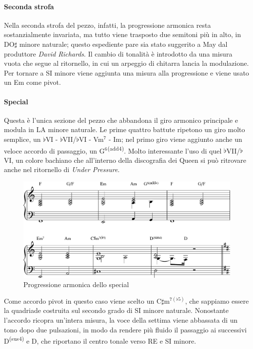 \documentclass[12pt]{article}
\begin{document}
\paragraph{Seconda strofa}
Nella seconda strofa del pezzo, infatti, la progressione armonica resta sostanzialmente invariata, ma tutto viene trasposto due semitoni più in alto, in DO\(\sharp\) minore naturale; questo espediente pare sia stato suggerito a May dal produttore \emph{David Richards}. Il cambio di tonalità è introdotto da una misura vuota che segue al ritornello, in cui un arpeggio di chitarra lancia la modulazione. Per tornare a SI minore viene aggiunta una misura alla progressione e viene usato un Em come pivot.

\paragraph{Special}
Questa è l'unica sezione del pezzo che abbandona il giro armonico principale e modula in LA minore naturale. Le prime quattro battute ripetono un giro molto semplice, un \(\flat\)VI - \(\flat\)VII/\(\flat\)VI - Vm\(^{7}\) - Im; nel primo giro viene aggiunto anche un veloce accordo di passaggio, un G\(^{6}\)\textsuperscript{(add\(4\))}. Molto interessante l'uso di quel \(\flat\)VII/\(\flat\)VI, un colore bachiano che all'interno della discografia dei Queen si può ritrovare anche nel ritornello di \emph{Under Pressure}.

\begin{figure}[H]
 \centering
 \includegraphics[width=\textwidth,keepaspectratio]{aa/special-chords}
 \caption{Progressione armonica dello special}
 \label{fig:special}
\end{figure}

Come accordo pivot in questo caso viene scelto un C\(\sharp\)m\(^{7(\flat5)}\), che sappiamo essere la quadriade costruita sul secondo grado di SI minore naturale. Nonostante l'accordo ricopra un'intera misura, la voce della settima viene abbassata di un tono dopo due pulsazioni, in modo da rendere più fluido il passaggio ai successivi D\textsuperscript{(sus\(4\))} e D, che riportano il centro tonale verso RE e SI minore.
\end{document}

